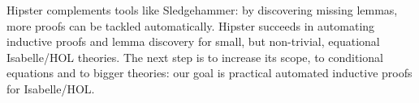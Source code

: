Hipster complements tools like Sledgehammer: by discovering missing
lemmas, more proofs can be tackled automatically. Hipster succeeds in
automating inductive proofs and lemma discovery for small, but
non-trivial, equational Isabelle/HOL theories. The next step is to
increase its scope, to conditional equations and to bigger theories:
our goal is practical automated inductive proofs for Isabelle/HOL.


